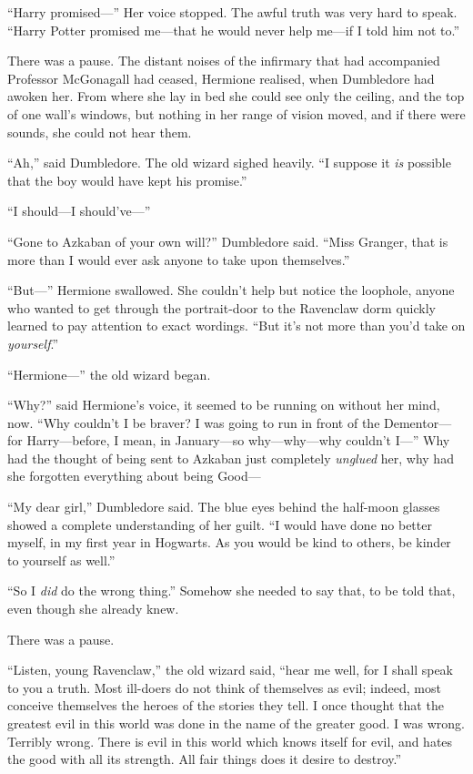 ``Harry promised---'' Her voice stopped. The awful truth was very hard
to speak. ``Harry Potter promised me---that he would never help me---if
I told him not to.''

There was a pause. The distant noises of the infirmary that had
accompanied Professor McGonagall had ceased, Hermione realised, when
Dumbledore had awoken her. From where she lay in bed she could see only
the ceiling, and the top of one wall's windows, but nothing in her range
of vision moved, and if there were sounds, she could not hear them.

``Ah,'' said Dumbledore. The old wizard sighed heavily. ``I suppose it
\emph{is} possible that the boy would have kept his promise.''

``I should---I should've---''

``Gone to Azkaban of your own will?'' Dumbledore said. ``Miss Granger,
that is more than I would ever ask anyone to take upon themselves.''

``But---'' Hermione swallowed. She couldn't help but notice the
loophole, anyone who wanted to get through the portrait-door to the
Ravenclaw dorm quickly learned to pay attention to exact wordings. ``But
it's not more than you'd take on \emph{yourself}.''

``Hermione---'' the old wizard began.

``Why?'' said Hermione's voice, it seemed to be running on without her
mind, now. ``Why couldn't I be braver? I was going to run in front of
the Dementor---for Harry---before, I mean, in January---so
why---why---why couldn't I---'' Why had the thought of being sent to
Azkaban just completely \emph{unglued} her, why had she forgotten
everything about being Good---

``My dear girl,'' Dumbledore said. The blue eyes behind the half-moon
glasses showed a complete understanding of her guilt. ``I would have
done no better myself, in my first year in Hogwarts. As you would be
kind to others, be kinder to yourself as well.''

``So I \emph{did} do the wrong thing.'' Somehow she needed to say that,
to be told that, even though she already knew.

There was a pause.

``Listen, young Ravenclaw,'' the old wizard said, ``hear me well, for I
shall speak to you a truth. Most ill-doers do not think of themselves as
evil; indeed, most conceive themselves the heroes of the stories they
tell. I once thought that the greatest evil in this world was done in
the name of the greater good. I was wrong. Terribly wrong. There is evil
in this world which knows itself for evil, and hates the good with all
its strength. All fair things does it desire to destroy.''


